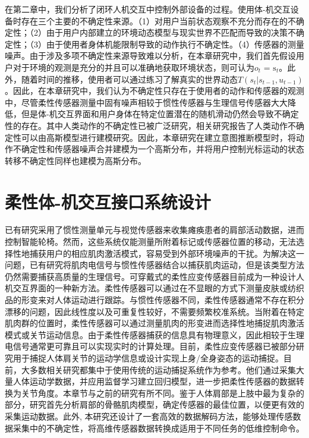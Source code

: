 在第二章中，我们分析了闭环人机交互中控制外部设备的过程。使用体-机交互设备时存在三个主要的不确定性来源。（1）对用户当前状态观察不充分而存在的不确定性；（2）由于用户内部建立的环境动态模型与现实世界不匹配而导致的决策不确定性；（3）由于使用者身体机能限制导致的动作执行不确定性。（4）传感器的测量噪声。由于涉及多项不确定性来源导致难以分析，在本章研究中，我们首先假设用户对于环境的观测是充分的并且可以准确地获取环境状态，则可认为${o_t}{\text{ = }}{{\text{s}}_t}$。此外，随着时间的推移，使用者可以通过练习了解真实的世界动态$T({s_t}|{s_{t - 1}},{u_{t - 1}})$。因此，在本章研究中，我们认为不确定性只存在于使用者的动作和传感器的观测中，尽管柔性传感器测量中固有噪声相较于惯性传感器与生理信号传感器大大降低，但是体-机交互界面和用户身体在特定位置潜在的随机滑动仍然会导致不确定性的存在。其中人类动作的不确定性已被广泛研究\cite{churchlandCentralSourceMovement2006,vanbeersRoleExecutionNoise2004, desantisGuidingFunctionalReorganization2020a}，相关研究报告了人类动作不确定性可以由高斯模型进行建模研究。因此，本章研究在建立意图推断模型时，将动作不确定性和传感器噪声合并建模为一个高斯分布，并将用户控制光标运动的状态转移不确定性同样也建模为高斯分布。

\section{柔性体-机交互接口系统设计} 

已有研究采用了惯性测量单元与视觉传感器来收集瘫痪患者的肩部活动数据，进而控制智能轮椅\cite{thorpUpperBodyBasedPower2016d,seanez-gonzalezCursorControlKalman2014}。然而，这些系统仅能测量所附着标记或传感器位置的移动，无法选择性地捕获用户的相应肌肉激活模式，容易受到外部环境噪声的干扰。为解决这一问题，已有研究将肌肉电信号与惯性传感器结合以捕获肌肉运动\cite{rizzoglioHybridBodyMachineInterface2020}，但是该类型方法仍然需要捕获高质量的生理信号。可穿戴式的柔性应变传感器目前成为一种设计人机交互界面的一种新方法\cite{dongStretchableHumanMachine2020}。柔性传感器可以通过在不显眼的方式下测量皮肤或纺织品的形变来对人体运动进行跟踪。与惯性传感器不同，柔性传感器通常不存在积分漂移的问题，因此线性度以及可重复性较好，不需要频繁校准系统。当附着在特定肌肉群的位置时，柔性传感器可以通过测量肌肉的形变进而选择性地捕捉肌肉激活模式或关节运动信息。由于柔性传感器捕获的信息具有物理意义，因此相较于生理电信号通常更可靠且可以实现实时的计算处理。目前，柔性应变传感器已被部分研究用于捕捉人体肩关节的运动学信息\cite{jinSoftSensingShirt2020,leePrintableSkinAdhesive2016,samper-escuderoEfficientMultiaxialShoulderMotion2020}或设计实现上身/全身姿态的运动捕捉\cite{contreras-gonzalezEfficientUpperLimb2020,ogataEstimatingMovementsHuman2019,kimDeepFullBodyMotion2019}。目前，大多数相关研究都集中于使用传统的运动捕捉系统作为参考。他们通过采集大量人体运动学数据，并应用监督学习建立回归模型，进一步把柔性传感器的数据转换为关节角度。本章节与之前的研究有所不同。鉴于人体肩部是上肢中最为复杂的部分，研究首先分析肩部的骨骼肌肉模型，确定传感器的最佳位置，以便更有效的采集运动数据。此外, 本研究还设计了一套高效的数据解码方法，能够处理传感数据采集中的不确定性，将高维传感器数据转换成适用于不同任务的低维控制命令。


